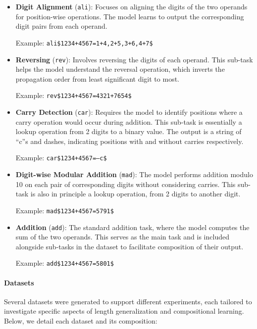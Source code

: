 \begin{itemize}
    \item \textbf{Digit Alignment} (\texttt{ali}): Focuses on aligning the digits of the two operands for position-wise operations. The model learns to output the corresponding digit pairs from each operand.

          Example: \texttt{ali\$1234+4567=1+4,2+5,3+6,4+7\$}

    \item \textbf{Reversing} (\texttt{rev}): Involves reversing the digits of each operand. This sub-task helps the model understand the reversal operation, which inverts the propagation order from least significant digit to most.

          Example: \texttt{rev\$1234+4567=4321+7654\$}

    \item \textbf{Carry Detection} (\texttt{car}): Requires the model to identify positions where a carry operation would occur during addition. This sub-task is essentially a lookup operation from 2 digits to a binary value. The output is a string of ``c''s and dashes, indicating positions with and without carries respectively.

          Example: \texttt{car\$1234+4567=---c\$}

    \item \textbf{Digit-wise Modular Addition} (\texttt{mad}): The model performs addition modulo 10 on each pair of corresponding digits without considering carries. This sub-task is also in principle a lookup operation, from 2 digits to another digit.

          Example: \texttt{mad\$1234+4567=5791\$}

    \item \textbf{Addition} (\texttt{add}): The standard addition task, where the model computes the sum of the two operands. This serves as the main task and is included alongside sub-tasks in the dataset to facilitate composition of their output.

          Example: \texttt{add\$1234+4567=5801\$}
\end{itemize}

\paragraph{Datasets}

Several datasets were generated to support different experiments, each tailored to investigate specific aspects of length generalization and compositional learning. Below, we detail each dataset and its composition:

